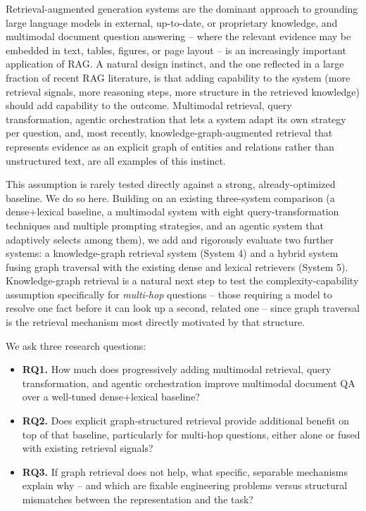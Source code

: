\documentclass[sigconf,anonymous,review]{acmart}
\begin{document}
Retrieval-augmented generation systems are the dominant approach to grounding large language models in external, up-to-date, or proprietary knowledge, and multimodal document question answering -- where the relevant evidence may be embedded in text, tables, figures, or page layout -- is an increasingly important application of RAG. A natural design instinct, and the one reflected in a large fraction of recent RAG literature, is that adding capability to the system (more retrieval signals, more reasoning steps, more structure in the retrieved knowledge) should add capability to the outcome. Multimodal retrieval, query transformation, agentic orchestration that lets a system adapt its own strategy per question, and, most recently, knowledge-graph-augmented retrieval that represents evidence as an explicit graph of entities and relations rather than unstructured text, are all examples of this instinct.

This assumption is rarely tested directly against a strong, already-optimized baseline. We do so here. Building on an existing three-system comparison (a dense+lexical baseline, a multimodal system with eight query-transformation techniques and multiple prompting strategies, and an agentic system that adaptively selects among them), we add and rigorously evaluate two further systems: a knowledge-graph retrieval system (System 4) and a hybrid system fusing graph traversal with the existing dense and lexical retrievers (System 5). Knowledge-graph retrieval is a natural next step to test the complexity-capability assumption specifically for \emph{multi-hop} questions -- those requiring a model to resolve one fact before it can look up a second, related one -- since graph traversal is the retrieval mechanism most directly motivated by that structure.

We ask three research questions:

\begin{itemize}
\item \textbf{RQ1.} How much does progressively adding multimodal retrieval, query transformation, and agentic orchestration improve multimodal document QA over a well-tuned dense+lexical baseline?
\item \textbf{RQ2.} Does explicit graph-structured retrieval provide additional benefit on top of that baseline, particularly for multi-hop questions, either alone or fused with existing retrieval signals?
\item \textbf{RQ3.} If graph retrieval does not help, what specific, separable mechanisms explain why -- and which are fixable engineering problems versus structural mismatches between the representation and the task?
\end{itemize}
\end{document}
